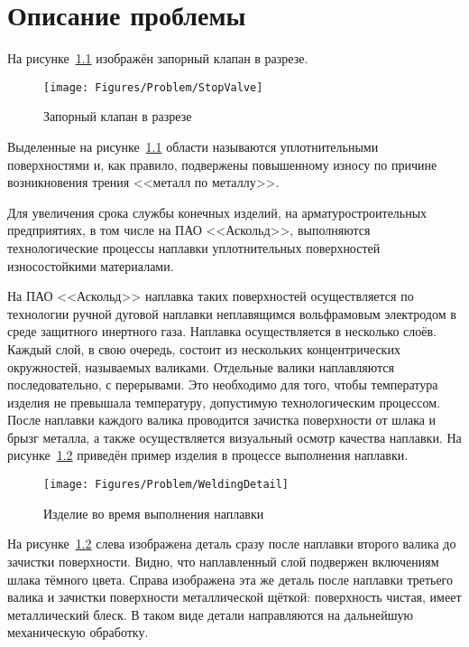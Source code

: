 \chapter{Описание проблемы}
На рисунке~\ref{fig:Problem:Stop Valve} изображён запорный клапан в разрезе.

\begin{figure}[H]
    \centering
    \vspace{14pt}
    \texttt{[image: Figures/Problem/StopValve]}
    \caption{Запорный клапан в разрезе}
    \label{fig:Problem:Stop Valve}
\end{figure}

Выделенные на рисунке~\ref{fig:Problem:Stop Valve} области называются уплотнительными поверхностями и, как правило, подвержены повышенному износу по причине возникновения трения <<металл по металлу>>.

Для увеличения срока службы конечных изделий, на арматуростроительных предприятиях, в том числе на ПАО <<Аскольд>>, выполняются технологические процессы наплавки уплотнительных поверхностей износостойкими материалами.

На ПАО <<Аскольд>> наплавка таких поверхностей осуществляется по технологии ручной дуговой наплавки неплавящимся вольфрамовым электродом в среде защитного инертного газа.
Наплавка осуществляется в несколько слоёв.
Каждый слой, в свою очередь, состоит из нескольких концентрических окружностей, называемых валиками.
Отдельные валики наплавляются последовательно, с перерывами.
Это необходимо для того, чтобы температура изделия не превышала температуру, допустимую технологическим процессом.
После наплавки каждого валика проводится зачистка поверхности от шлака и брызг металла, а также осуществляется визуальный осмотр качества наплавки.
На рисунке~\ref{fig:Problem:Welding Detail} приведён пример изделия в процессе выполнения наплавки.

\begin{figure}[H]
    \centering
    \vspace{14pt}
    \texttt{[image: Figures/Problem/WeldingDetail]}
    \caption{Изделие во время выполнения наплавки}
    \label{fig:Problem:Welding Detail}
\end{figure}

На рисунке~\ref{fig:Problem:Welding Detail} слева изображена деталь сразу после наплавки второго валика до зачистки поверхности.
Видно, что наплавленный слой подвержен включениям шлака тёмного цвета.
Справа изображена эта же деталь после наплавки третьего валика и зачистки поверхности металлической щёткой: поверхность чистая, имеет металлический блеск.
В таком виде детали направляются на дальнейшую механическую обработку.

